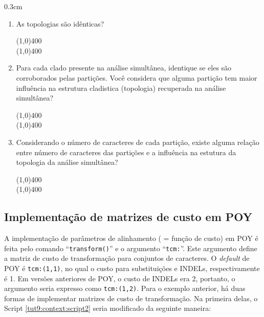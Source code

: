 \begin{refsection}
\vspace{5pt}

\begin {myindentpar}{0.3cm}
\begin{enumerate}[\itshape i.]

	\item{As topologias são idênticas?}

\line(1,0){400}\\
\line(1,0){400}\\


	\item{Para cada clado presente na análise simultânea, identique se eles são corroborados pelas partições. Você considera que alguma partição tem maior influência na estrutura cladistica (topologia) recuperada na análise simultânea?}

\line(1,0){400}\\
\line(1,0){400}\\

	\item{Considerando o número de caracteres de cada partição, existe alguma relação entre número de caracteres das partições e a influência na estutura da topologia da análise simultânea?}

\line(1,0){400}\\
\line(1,0){400}\\

\end{enumerate}
\end{myindentpar}

\subsection{Implementação de matrizes de custo em POY}\label{tut9:context:tcm}

A implementação de parâmetros de alinhamento ( = função de custo) em POY é feita pelo comando ``\texttt{transform()}'' e o argumento ``\texttt{tcm:}''. Este argumento define a matriz de custo de transformação para conjuntos de caracteres. O \textit{default} de POY é \texttt{tcm:(1,1)}, no qual o custo para substituições e INDELs, respectivamente é 1. Em versões anteriores de POY, o custo de INDELs era 2, portanto, o argumento seria expresso como \texttt{tcm:(1,2)}. Para o exemplo anterior, há duas formas de implementar matrizes de custo de transformação. Na primeira delas, o Script \ref{tut9:context:script2} seria modificado da seguinte maneira:\\



\end{refsection}
